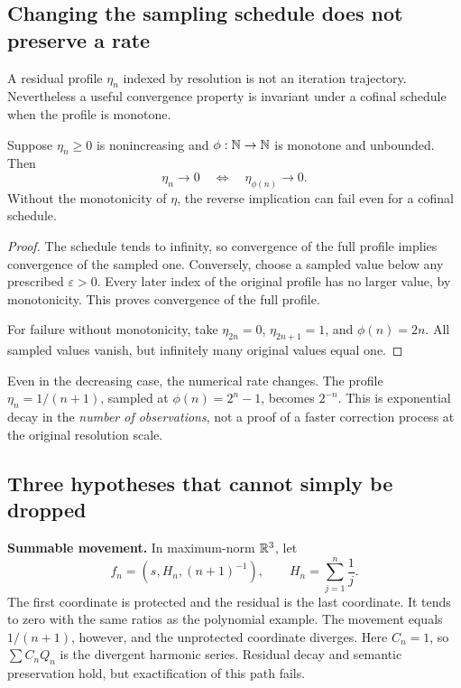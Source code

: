 \subsection{Changing the sampling schedule does not preserve a rate}
A residual profile \(\eta_n\) indexed by resolution is not an iteration trajectory. Nevertheless a useful convergence property is invariant under a cofinal schedule when the profile is monotone.

\begin{KSproposition}\label{KS:KS75}
Suppose \(\eta_n\ge0\) is nonincreasing and \(\phi:\mathbb N\to\mathbb N\) is monotone and unbounded. Then
\[
 \eta_n\to0\quad\Longleftrightarrow\quad\eta_{\phi(n)}\to0.
\]
Without the monotonicity of \(\eta\), the reverse implication can fail even for a cofinal schedule.
\end{KSproposition}
\begin{proof}
The schedule tends to infinity, so convergence of the full profile implies convergence of the sampled one. Conversely, choose a sampled value below any prescribed \(\varepsilon>0\). Every later index of the original profile has no larger value, by monotonicity. This proves convergence of the full profile.

For failure without monotonicity, take \(\eta_{2n}=0\), \(\eta_{2n+1}=1\), and \(\phi(n)=2n\). All sampled values vanish, but infinitely many original values equal one.
\end{proof}
Even in the decreasing case, the numerical rate changes. The profile \(\eta_n=1/(n+1)\), sampled at \(\phi(n)=2^n-1\), becomes \(2^{-n}\). This is exponential decay in the \emph{number of observations}, not a proof of a faster correction process at the original resolution scale.

\subsection{Three hypotheses that cannot simply be dropped}
\textbf{Summable movement.} In maximum-norm \(\mathbb R^3\), let
\[
 f_n=(s,H_n,(n+1)^{-1}),\qquad
 H_n=\sum_{j=1}^{n}\frac1j.
\]
The first coordinate is protected and the residual is the last coordinate. It tends to zero with the same ratios as the polynomial example. The movement equals \(1/(n+1)\), however, and the unprotected coordinate diverges. Here \(C_n=1\), so \(\sum C_nQ_n\) is the divergent harmonic series. Residual decay and semantic preservation hold, but exactification of this path fails.

